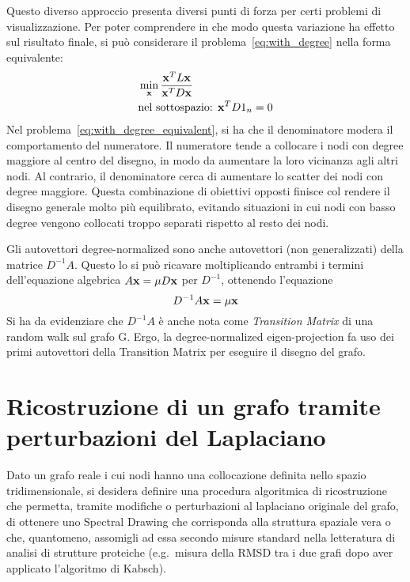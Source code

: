 \documentclass[10pt,a4paper]{article}
\begin{document}
Questo diverso approccio presenta diversi punti di forza per certi problemi di visualizzazione.
Per poter comprendere in che modo questa variazione ha effetto sul risultato finale, si può considerare il problema~\eqref{eq:with_degree} nella forma equivalente:
\begin{align}
    & \min_{\vb{x}} \frac{\vb{x}^T L \vb{x}}{\vb{x}^T D \vb{x}} \label{eq:with_degree_equivalent}\\
    & \text{nel sottospazio: } \vb{x}^T D 1_n = 0
\end{align}
Nel problema~\eqref{eq:with_degree_equivalent}, si ha che il denominatore modera il comportamento del numeratore.
Il numeratore tende a collocare i nodi con degree maggiore al centro del disegno, in modo da aumentare la loro vicinanza agli altri nodi.
Al contrario, il denominatore cerca di aumentare lo scatter dei nodi con degree maggiore.
Questa combinazione di obiettivi opposti finisce col rendere il disegno generale molto più equilibrato, evitando situazioni in cui nodi con basso degree vengono collocati troppo separati rispetto al resto dei nodi.

Gli autovettori degree-normalized sono anche autovettori (non generalizzati) della matrice \(D^{-1} A\).
Questo lo si può ricavare moltiplicando entrambi i termini dell'equazione algebrica \(A\vb{x} = \mu D \vb{x}\) per \(D^{-1}\), ottenendo l'equazione
\begin{equation}
    D^{-1} A \vb{x} = \mu\vb{x}
\end{equation}
Si ha da evidenziare che \(D^{-1} A\) è anche nota come \textit{Transition Matrix} di una random walk sul grafo G. Ergo, la degree-normalized eigen-projection fa uso dei primi autovettori della Transition Matrix per eseguire il disegno del grafo.

\section{Ricostruzione di un grafo tramite perturbazioni del Laplaciano}\label{sec:perturbazioni}

Dato un grafo reale i cui nodi hanno una collocazione definita nello spazio tridimensionale, si desidera definire una procedura algoritmica di ricostruzione che permetta, tramite modifiche o perturbazioni al laplaciano originale del grafo, di ottenere uno Spectral Drawing che corrisponda alla struttura spaziale vera o che, quantomeno, assomigli ad essa secondo misure standard nella letteratura di analisi di strutture proteiche (e.g.~misura della RMSD tra i due grafi dopo aver applicato l'algoritmo di Kabsch).
\end{document}
